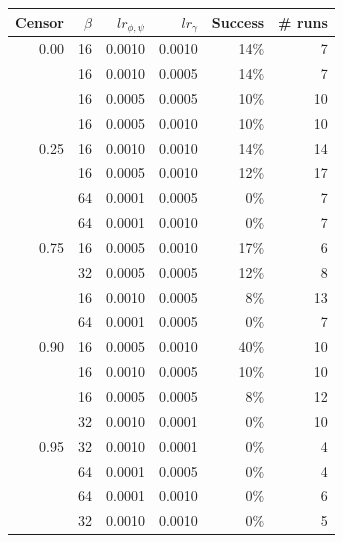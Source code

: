 \begin{table}[h]
\centering
\begin{tabular}{rrrrrr}
\toprule
Censor & $\beta$ &  ${lr}_{\phi,\psi}$&  ${lr}_\gamma$ & Success &  \# runs \\
\midrule
0.00 &      16 &            0.0010 &  0.0010 &         14\% &           7 \\
     &      16 &            0.0010 &  0.0005 &         14\% &           7 \\
     &      16 &            0.0005 &  0.0005 &         10\% &          10 \\
     &      16 &            0.0005 &  0.0010 &         10\% &          10 \\
0.25 &      16 &            0.0010 &  0.0010 &         14\% &          14 \\
     &      16 &            0.0005 &  0.0010 &         12\% &          17 \\
     &      64 &            0.0001 &  0.0005 &          0\% &           7 \\
     &      64 &            0.0001 &  0.0010 &          0\% &           7 \\
0.75 &      16 &            0.0005 &  0.0010 &         17\% &           6 \\
     &      32 &            0.0005 &  0.0005 &         12\% &           8 \\
     &      16 &            0.0010 &  0.0005 &          8\% &          13 \\
     &      64 &            0.0001 &  0.0005 &          0\% &           7 \\
0.90 &      16 &            0.0005 &  0.0010 &         40\% &          10 \\
     &      16 &            0.0010 &  0.0005 &         10\% &          10 \\
     &      16 &            0.0005 &  0.0005 &          8\% &          12 \\
     &      32 &            0.0010 &  0.0001 &          0\% &          10 \\
0.95 &      32 &            0.0010 &  0.0001 &          0\% &           4 \\
     &      64 &            0.0001 &  0.0005 &          0\% &           4 \\
     &      64 &            0.0001 &  0.0010 &          0\% &           6 \\
     &      32 &            0.0010 &  0.0010 &          0\% &           5 \\

\end{tabular}
\end{table}
